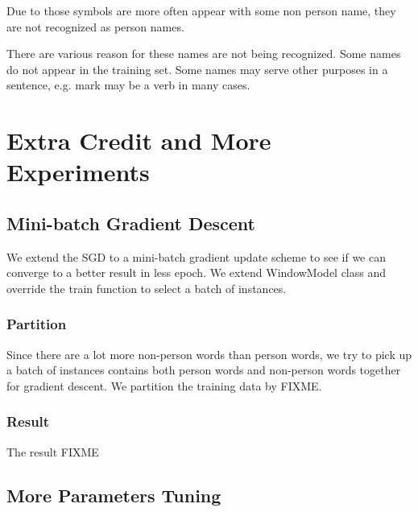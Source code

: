 \documentclass[letterpaper]{article}
\begin{document}
\begin{itemize}
Due to those symbols are more often appear with some non person name, they are not recognized as person names.

There are various reason for these names are not being recognized. Some names do not appear in the training set. Some names may serve other purposes in a sentence, e.g. mark may be a verb in many cases.
\end{itemize}
\section{Extra Credit and More Experiments}
\subsection{Mini-batch Gradient Descent}
We extend the SGD to a mini-batch gradient update scheme to see if we can converge to a better result in less epoch. We extend WindowModel class and override the train function to select a batch of instances.
\subsubsection{Partition}
Since there are a lot more non-person words than person words, we try to pick up a batch of instances contains both person words and non-person words together for gradient descent. We partition the training data by FIXME.
\subsubsection{Result}
The result FIXME
\subsection{More Parameters Tuning}
\end{document}
